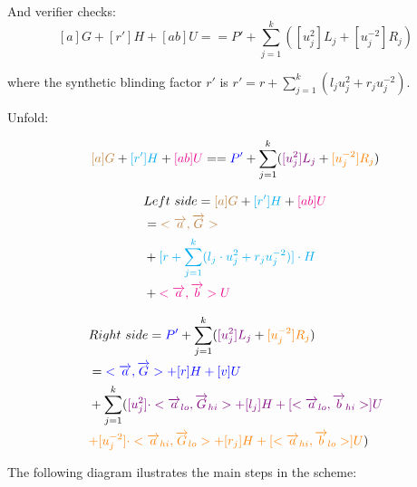 \documentclass{article}
\theoremstyle{definition}
\begin{document}
And verifier checks:
$$[a]G + [r'] H + [ab] U == P' + \sum_{j=1}^k ( [u_j^2] L_j + [u_j^{-2}] R_j)$$

where the synthetic blinding factor $r'$ is $r' = r + \sum_{j=1}^k (l_j u_j^2 + r_j u_j^{-2})$.

\vspace{1cm}

Unfold:

$$
\textcolor{brown}{[a]G} + \textcolor{cyan}{[r'] H} + \textcolor{magenta}{[ab] U}
==
\textcolor{blue}{P'} + \sum_{j=1}^k ( \textcolor{violet}{[u_j^2] L_j} + \textcolor{orange}{[u_j^{-2}] R_j})
$$

\begin{align*}
&Left~side = \textcolor{brown}{[a]G} + \textcolor{cyan}{[r'] H} + \textcolor{magenta}{[ab] U}\\
& = \textcolor{brown}{< \overrightarrow{a}, \overrightarrow{G} >}\\
&+ \textcolor{cyan}{[r + \sum_{j=1}^k (l_j \cdot u_j^2 + r_j u_j^{-2})] \cdot H}\\
&+ \textcolor{magenta}{< \overrightarrow{a}, \overrightarrow{b} > U}
\end{align*}


\begin{align*}
&Right~side = \textcolor{blue}{P'} + \sum_{j=1}^k ( \textcolor{violet}{[u_j^2] L_j} + \textcolor{orange}{[u_j^{-2}] R_j})\\
&= \textcolor{blue}{< \overrightarrow{a}, \overrightarrow{G}> + [r] H + [v] U}\\
&+ \sum_{j=1}^k (
\textcolor{violet}{[u_j^2] \cdot <\overrightarrow{a}_{lo}, \overrightarrow{G}_{hi}> + [l_j] H + [<\overrightarrow{a}_{lo}, \overrightarrow{b}_{hi}>] U}\\
&\textcolor{orange}{+ [u_j^{-2}] \cdot <\overrightarrow{a}_{hi}, \overrightarrow{G}_{lo}> + [r_j] H + [<\overrightarrow{a}_{hi}, \overrightarrow{b}_{lo}>] U}
)
\end{align*}


\vspace{1.5cm}
The following diagram ilustrates the main steps in the scheme:
\end{document}
